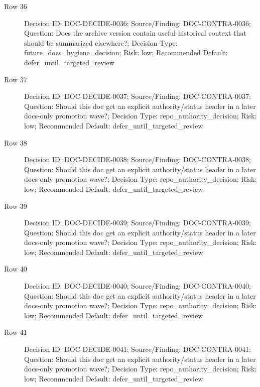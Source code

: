 \documentclass[9pt,a4paper,openany]{book}
\begin{document}
\begin{description}
\item[Row 36] Decision ID: DOC-\allowbreak{}DECIDE-\allowbreak{}0036; Source/\allowbreak{}Finding: DOC-\allowbreak{}CONTRA-\allowbreak{}0036; Question: Does the archive version contain useful historical context that should be summarized elsewhere?; Decision Type: future\_\allowbreak{}docs\_\allowbreak{}hygiene\_\allowbreak{}decision; Risk: low; Recommended Default: defer\_\allowbreak{}until\_\allowbreak{}targeted\_\allowbreak{}review
\item[Row 37] Decision ID: DOC-\allowbreak{}DECIDE-\allowbreak{}0037; Source/\allowbreak{}Finding: DOC-\allowbreak{}CONTRA-\allowbreak{}0037; Question: Should this doc get an explicit authority/\allowbreak{}status header in a later docs-\allowbreak{}only promotion wave?; Decision Type: repo\_\allowbreak{}authority\_\allowbreak{}decision; Risk: low; Recommended Default: defer\_\allowbreak{}until\_\allowbreak{}targeted\_\allowbreak{}review
\item[Row 38] Decision ID: DOC-\allowbreak{}DECIDE-\allowbreak{}0038; Source/\allowbreak{}Finding: DOC-\allowbreak{}CONTRA-\allowbreak{}0038; Question: Should this doc get an explicit authority/\allowbreak{}status header in a later docs-\allowbreak{}only promotion wave?; Decision Type: repo\_\allowbreak{}authority\_\allowbreak{}decision; Risk: low; Recommended Default: defer\_\allowbreak{}until\_\allowbreak{}targeted\_\allowbreak{}review
\item[Row 39] Decision ID: DOC-\allowbreak{}DECIDE-\allowbreak{}0039; Source/\allowbreak{}Finding: DOC-\allowbreak{}CONTRA-\allowbreak{}0039; Question: Should this doc get an explicit authority/\allowbreak{}status header in a later docs-\allowbreak{}only promotion wave?; Decision Type: repo\_\allowbreak{}authority\_\allowbreak{}decision; Risk: low; Recommended Default: defer\_\allowbreak{}until\_\allowbreak{}targeted\_\allowbreak{}review
\item[Row 40] Decision ID: DOC-\allowbreak{}DECIDE-\allowbreak{}0040; Source/\allowbreak{}Finding: DOC-\allowbreak{}CONTRA-\allowbreak{}0040; Question: Should this doc get an explicit authority/\allowbreak{}status header in a later docs-\allowbreak{}only promotion wave?; Decision Type: repo\_\allowbreak{}authority\_\allowbreak{}decision; Risk: low; Recommended Default: defer\_\allowbreak{}until\_\allowbreak{}targeted\_\allowbreak{}review
\item[Row 41] Decision ID: DOC-\allowbreak{}DECIDE-\allowbreak{}0041; Source/\allowbreak{}Finding: DOC-\allowbreak{}CONTRA-\allowbreak{}0041; Question: Should this doc get an explicit authority/\allowbreak{}status header in a later docs-\allowbreak{}only promotion wave?; Decision Type: repo\_\allowbreak{}authority\_\allowbreak{}decision; Risk: low; Recommended Default: defer\_\allowbreak{}until\_\allowbreak{}targeted\_\allowbreak{}review

\end{description}
\end{document}
